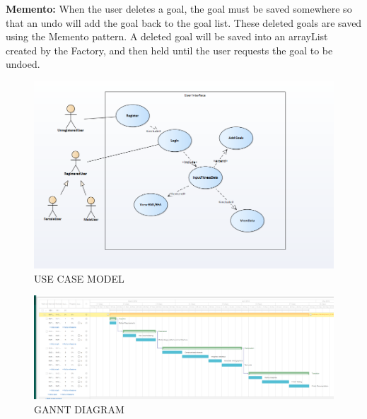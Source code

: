 \documentclass[10pt]{article}
\begin{document}
\textbf{Memento:} When the user deletes a goal, the goal must be saved
somewhere so that an undo will add the goal back to the goal list. These
deleted goals are saved using the Memento pattern. A deleted goal will
be saved into an arrayList created by the Factory, and then held until
the user requests the goal to be undoed.



\begin{figure}[p!]
	\begin{center}
		\includegraphics[width=\columnwidth]{UseCaseModel.jpg}
		\caption{{USE CASE MODEL
				{\label{div-915296}}%
		}}
	\end{center}
\end{figure}


\begin{figure}[p!]
	\begin{center}
		\includegraphics[width=\columnwidth]{Gannt1.png}
		\caption{{GANNT DIAGRAM
				{\label{div-327881}}%
		}}
	\end{center}
\end{figure}
\end{document}
